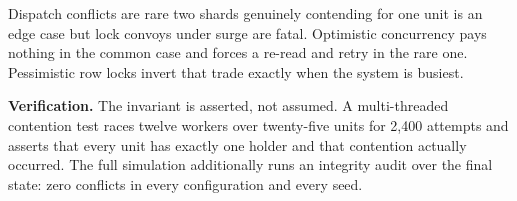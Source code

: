 Dispatch conflicts are rare \textemdash{} two shards genuinely contending for
one unit is an edge case \textemdash{} but lock convoys under surge are fatal.
Optimistic concurrency pays nothing in the common case and forces a re-read
and retry in the rare one. Pessimistic row locks invert that trade exactly
when the system is busiest.

\begin{keybox}
\textbf{Verification.} The invariant is asserted, not assumed. A
multi-threaded contention test races twelve workers over twenty-five units for
2{,}400 attempts and asserts that every unit has exactly one holder and that
contention actually occurred. The full simulation additionally runs an
integrity audit over the final state: zero conflicts in every configuration
and every seed.
\end{keybox}
